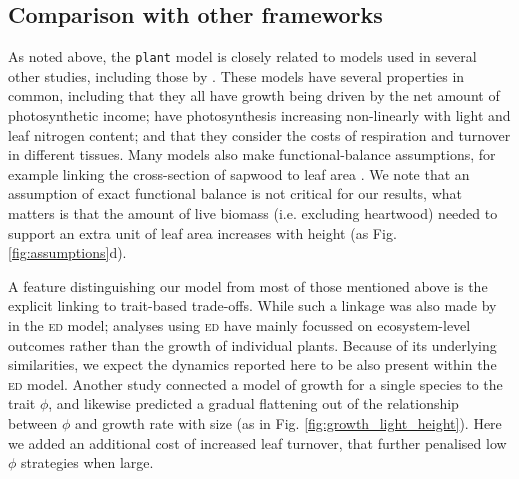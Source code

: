 \documentclass[9pt,twocolumn,twoside]{pnas-new}
\newcommand{\plant}{\texttt{plant}}
\begin{document}
\subsection{Comparison with other frameworks}

As noted above, the {\plant} model is closely related to models used in several other studies, including those by \citep{Givnish-1988, Yokozawa-1995, Makela-1997, King-1999, King-2005, Moorcroft-2001, Li-2014}. These models have several properties in common, including that they all have growth being driven by the net amount of photosynthetic income; have photosynthesis increasing non-linearly with light and leaf nitrogen content; and that they consider the costs of respiration and turnover in different tissues. Many models also make functional-balance assumptions, for example linking the cross-section of sapwood to leaf area \citep{Givnish-1988, Yokozawa-1995, Makela-1997, King-2005, Moorcroft-2001}. We note that an assumption of exact functional balance is not critical for our results, what matters is that the amount of live biomass (i.e. excluding heartwood) needed to support an extra unit of leaf area increases with height (as Fig. \ref{fig:assumptions}d).

A feature distinguishing our model from most of those mentioned above is the explicit linking to trait-based trade-offs. While such a linkage was also made by \citep{Moorcroft-2001} in the \textsc{ed} model; analyses using \textsc{ed} have mainly focussed on ecosystem-level outcomes rather than the growth of individual plants. Because of its underlying similarities, we expect the dynamics reported here to be also present within the \textsc{ed} model. Another study \citep{King-1999} connected a model of growth for a single species to the trait $\phi$, and likewise predicted a gradual flattening out of the relationship between $\phi$ and growth rate with size (as in Fig. \ref{fig:growth_light_height}). Here we added an additional cost of increased leaf turnover, that further penalised low $\phi$ strategies when large.
\end{document}
